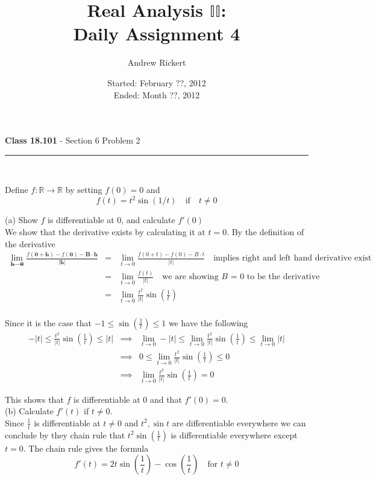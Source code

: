 \documentclass[11pt,reqno]{article}
\title{Real Analysis $\mathbb{II}$: \\ Daily Assignment 4}
\author{Andrew Rickert}
\date{Started: February ??, 2012 \\ \hspace{1pt} Ended: Month ??,  2012}                                           %
\begin{document}
\maketitle

\begin{flushleft} 
\textbf{Class 18.101} - Section 6 Problem 2\\
\rule{500pt}{1pt}\\
\end{flushleft} 

\noindent Define $f: \mathbb{R} \to \mathbb{R}$ by setting $f(0) = 0$ and
\[ f(t) = t^2 \sin(1/t) \quad \text{if} \quad t \neq 0 \]

\noindent (a) Show $f$ is differentiable at $0$, and calculate $f'(0)$\\

We show that the derivative exists by calculating it at $t = 0$. By the definition of the derivative
\begin{eqnarray*}
\lim_{\textbf{h} \to \textbf{0}} \frac{f(\textbf{0} + \textbf{h}) - f(\textbf{0}) - \textbf{B}\cdot \textbf{h}}{|\textbf{h}|} &=&  \lim_{t \to 0} \frac{f(0 + t) - f(0) - B \cdot t}{|t|} \quad \text{implies right and left hand derivative exist}\\
&=& \lim_{t \to 0} \frac{f(t)}{|t|} \quad \text{we are showing $B$ = 0 to be the derivative}\\
&=& \lim_{t \to 0} \frac{t^2}{|t|} \sin(\frac{1}{t})\\
\end{eqnarray*}

\noindent Since it is the case that $-1 \le \sin(\frac{1}{t}) \le 1$ we have the following
\begin{eqnarray*}
-|t| \le \frac{t^2}{|t|} \sin(\frac{1}{t}) \le |t| &\implies& \lim_{t \to 0} -|t| \le \lim_{t \to 0} \frac{t^2}{|t|} \sin(\frac{1}{t}) \le \lim_{t \to 0} |t| \\
& \implies & 0 \le \lim_{t \to 0} \frac{t^2}{|t|} \sin(\frac{1}{t}) \le 0 \\
& \implies & \lim_{t \to 0} \frac{t^2}{|t|} \sin(\frac{1}{t}) = 0
\end{eqnarray*}

\noindent This shows that $f$ is differentiable at 0 and that $f'(0) = 0$.\\

\noindent (b) Calculate $f'(t)$ if $t \neq 0$.\\

Since $\frac{1}{t}$ is differentiable at $t \neq 0$ and $t^2, \sin t$ are differentiable everywhere we can conclude by they chain rule that $t^2 \sin (\frac{1}{t} )$ is differentiable everywhere except $t = 0$. The chain rule gives the formula
\[ f'(t) = 2t \sin( \frac{1}{t} ) - \cos(\frac{1}{t}) \quad \text{for $t \neq 0$}\]
\end{document}
